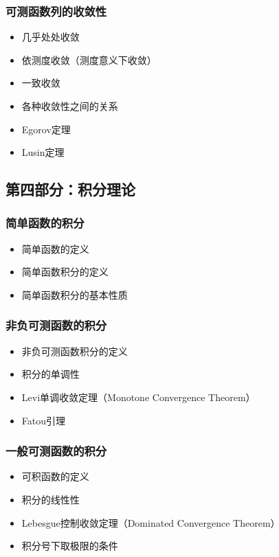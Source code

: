 \subsubsection{可测函数列的收敛性}
\begin{itemize}
    \item 几乎处处收敛
    \item 依测度收敛（测度意义下收敛）
    \item 一致收敛
    \item 各种收敛性之间的关系
    \item Egorov定理
    \item Lusin定理
\end{itemize}

\subsection{第四部分：积分理论}

\subsubsection{简单函数的积分}
\begin{itemize}
    \item 简单函数的定义
    \item 简单函数积分的定义
    \item 简单函数积分的基本性质
\end{itemize}

\subsubsection{非负可测函数的积分}
\begin{itemize}
    \item 非负可测函数积分的定义
    \item 积分的单调性
    \item Levi单调收敛定理（Monotone Convergence Theorem）
    \item Fatou引理
\end{itemize}

\subsubsection{一般可测函数的积分}
\begin{itemize}
    \item 可积函数的定义
    \item 积分的线性性
    \item Lebesgue控制收敛定理（Dominated Convergence Theorem）
    \item 积分号下取极限的条件
\end{itemize}

